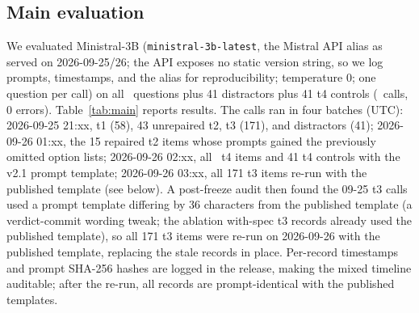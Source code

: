 \documentclass[11pt]{article}
\begin{document}
\subsection{Main evaluation}
We evaluated Ministral-3B (\texttt{ministral-3b-latest}, the Mistral API alias as served on 2026-09-25/26; the API exposes no static version string, so we log prompts, timestamps, and the alias for reproducibility; temperature 0; one question per call) on all \NTotal\ questions plus 41 distractors plus 41 t4 controls (\NCalls\ calls, 0 errors). Table~\ref{tab:main} reports results. The calls ran in four batches (UTC): 2026-09-25 21:xx, t1 (58), 43 unrepaired t2, t3 (171), and distractors (41); 2026-09-26 01:xx, the 15 repaired t2 items whose prompts gained the previously omitted option lists; 2026-09-26 02:xx, all \NTfour\ t4 items and 41 t4 controls with the v2.1 prompt template; 2026-09-26 03:xx, all 171 t3 items re-run with the published template (see below). A post-freeze audit then found the 09-25 t3 calls used a prompt template differing by 36 characters from the published template (a verdict-commit wording tweak; the ablation with-spec t3 records already used the published template), so all 171 t3 items were re-run on 2026-09-26 with the published template, replacing the stale records in place. Per-record timestamps and prompt SHA-256 hashes are logged in the release, making the mixed timeline auditable; after the re-run, all records are prompt-identical with the published templates.
\end{document}
